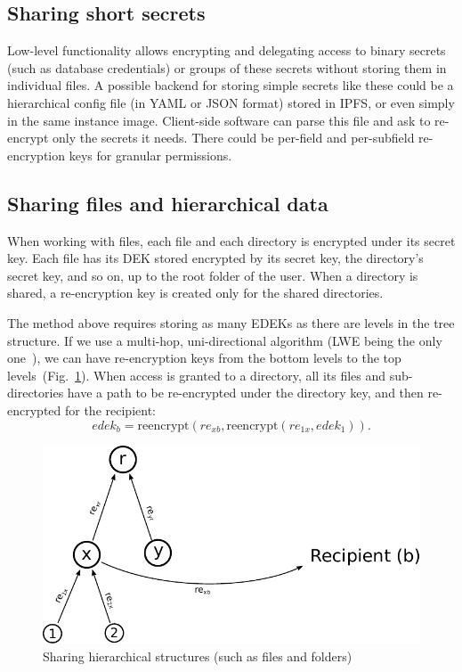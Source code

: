 \documentclass[longbibliography,nofootinbib]{revtex4-1}
\newcommand{\figref}[1]{Fig.~\ref{#1}}
\begin{document}
\subsection{Sharing short secrets}

Low-level functionality allows encrypting and delegating access to binary secrets (such as database credentials) or groups of these secrets without
storing them in individual files.
A possible backend for storing simple secrets like these could be a hierarchical config file (in YAML or JSON format) stored in IPFS,
or even simply in the same instance image.
Client-side software can parse this file and ask to re-encrypt only the secrets it needs.
There could be per-field and per-subfield re-encryption keys for granular permissions.

\subsection{Sharing files and hierarchical data}
\label{sec:hierarchical-data}

When working with files, each file and each directory is encrypted under its secret key.
Each file has its DEK stored encrypted by its secret key, the directory's secret key, and so on, up to the root folder of the user.
When a directory is shared, a re-encryption key is created only for the shared directories.

The method above requires storing as many EDEKs as there are levels in the tree structure.
If we use a multi-hop, uni-directional algorithm (LWE being the only one~\cite{lwe-reencryption}), we can have re-encryption keys from the bottom levels to
the top levels~(\figref{fig:hierarchical-pre}).
When access is granted to a directory, all its files and sub-directories have a path to be re-encrypted under the directory key, and then re-encrypted for the
recipient:
\begin{equation}
    edek_b = \text{reencrypt}(re_{xb}, \text{reencrypt}(re_{1x}, edek_1)).
\end{equation}
\begin{figure}
\centering
    \includegraphics[width=0.45\columnwidth]{pdf/hierarchical.pdf}
    \caption{Sharing hierarchical structures (such as files and folders)}
    \label{fig:hierarchical-pre}
\end{figure}
\end{document}
